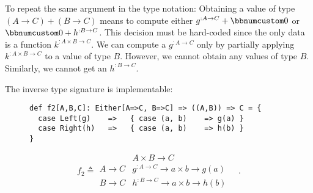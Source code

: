 To repeat the same argument in the type notation: Obtaining a value
of type $(A\rightarrow C)+(B\rightarrow C)$ means to compute either
$g^{:A\rightarrow C}+\bbnum 0$ or $\bbnum 0+h^{:B\rightarrow C}$.
This decision must be hard-coded since the only data is a function
$k^{:A\times B\rightarrow C}$. We can compute a $g^{:A\rightarrow C}$
only by partially applying $k^{:A\times B\rightarrow C}$ to a value
of type $B$. However, we cannot obtain any values of type $B$. Similarly,
we cannot get an $h^{:B\rightarrow C}$.

The inverse type signature is implementable:

\begin{wrapfigure}{l}{0.55\columnwidth}%
\vspace{0.6\baselineskip}
\begin{lstlisting}
def f2[A,B,C]: Either[A=>C, B=>C] => ((A,B)) => C = {
  case Left(g)    =>   { case (a, b)    => g(a) }
  case Right(h)   =>   { case (a, b)    => h(b) }
}
\end{lstlisting}

\vspace{-2.4\baselineskip}
\end{wrapfigure}%
\vspace{-1.2\baselineskip}

\noindent 
\[
f_{2}\triangleq\begin{array}{|c||c|}
 & A\times B\rightarrow C\\
\hline A\rightarrow C & g^{:A\rightarrow C}\rightarrow a\times b\rightarrow g(a)\\
B\rightarrow C & h^{:B\rightarrow C}\rightarrow a\times b\rightarrow h(b)
\end{array}\quad.
\]
\vspace{-0.9\baselineskip}

